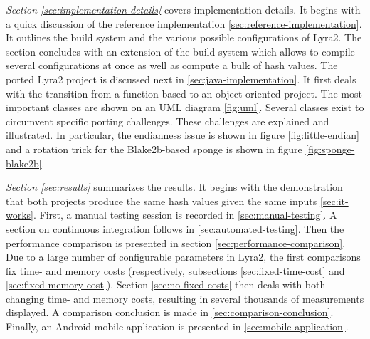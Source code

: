 \emph{Section \ref{sec:implementation-details}} covers implementation details. It begins with a quick discussion of the reference implementation \ref{sec:reference-implementation}. It outlines the build system and the various possible configurations of Lyra2. The section concludes with an extension of the build system which allows to compile several configurations at once as well as compute a bulk of hash values. The ported Lyra2 project is discussed next in \ref{sec:java-implementation}. It first deals with the transition from a function-based to an object-oriented project. The most important classes are shown on an UML diagram \ref{fig:uml}. Several classes exist to circumvent specific porting challenges. These challenges are explained and illustrated. In particular, the endianness issue is shown in figure \ref{fig:little-endian} and a rotation trick for the Blake2b-based sponge is shown in figure \ref{fig:sponge-blake2b}.

\emph{Section \ref{sec:results}} summarizes the results. It begins with the demonstration that both projects produce the same hash values given the same inputs \ref{sec:it-works}. First, a manual testing session is recorded in \ref{sec:manual-testing}. A section on continuous integration follows in \ref{sec:automated-testing}. Then the performance comparison is presented in section \ref{sec:performance-comparison}. Due to a large number of configurable parameters in Lyra2, the first comparisons fix time- and memory costs (respectively, subsections \ref{sec:fixed-time-cost} and \ref{sec:fixed-memory-cost}). Section \ref{sec:no-fixed-costs} then deals with both changing time- and memory costs, resulting in several thousands of measurements displayed. A comparison conclusion is made in \ref{sec:comparison-conclusion}. Finally, an Android mobile application is presented in \ref{sec:mobile-application}.
